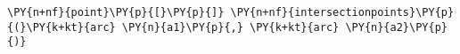 \begin{Verbatim}[commandchars=\\\{\}]
    \PY{n+nf}{point}\PY{p}{[}\PY{p}{]} \PY{n+nf}{intersectionpoints}\PY{p}{(}\PY{k+kt}{arc} \PY{n}{a1}\PY{p}{,} \PY{k+kt}{arc} \PY{n}{a2}\PY{p}{)}
\end{Verbatim}
